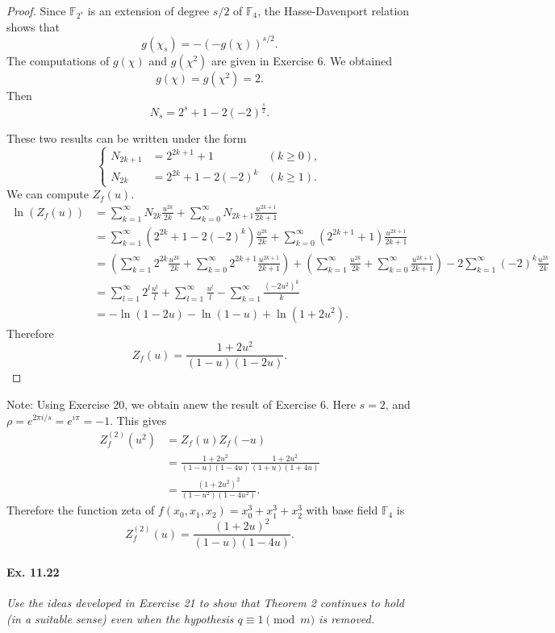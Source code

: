 \documentclass[11pt,a4paper]{article}
\newcommand{\F}{\mathbb{F}}
\begin{document}
\begin{proof}
Since $\F_{2^s}$ is an extension of degree $s/2$ of $\F_4$, the Hasse-Davenport relation shows that 
$$g(\chi_s) = -(-g(\chi))^{s/2}.$$
The computations of $g(\chi)$ and $g(\chi^2)$ are given in Exercise 6. We obtained 
$$g(\chi) = g(\chi^2) = 2.$$
Then
$$N_s = 2^s +1  - 2(-2)^{\frac{s}{2}}.$$

These two results can be written under the form
$$
\left\{
\begin{array}{lll}
N_{2k+1} &= 2^{2k+1} +1& (k \geq 0),\\
N_{2k} &= 2^{2k}+1 - 2 (-2)^k& (k \geq 1).
\end{array}
\right.
$$
We can compute $Z_f(u)$.
\begin{align*}
\ln(Z_f(u)) &= \sum_{k=1}^\infty N_{2k} \frac{u^{2k}}{2k} + \sum_{k=0}^\infty N_{2k+1} \frac{u^{2k+1}}{2k+1}\\
&= \sum_{k=1}^\infty \left(2^{2k} + 1 - 2(-2)^k \right) \frac{u^{2k}}{2k} + \sum_{k=0}^\infty \left( 2^{2k+1} + 1\right) \frac{u^{2k+1}}{2k+1}\\
&= \left(  \sum_{k=1}^\infty 2^{2k}  \frac{u^{2k}}{2k}  +  \sum_{k=0}^\infty 2^{2k+1} \frac{u^{2k+1}}{2k+1} \right) +  \left(  \sum_{k=1}^\infty \frac{u^{2k}}{2k}  +  \sum_{k=0}^\infty\frac{u^{2k+1}}{2k+1} \right)  -2  \sum_{k=1}^\infty(-2)^k \frac{u^{2k}}{2k} \\
&=  \sum_{l=1}^\infty 2^l \frac{u^l}{l} +  \sum_{l=1}^\infty  \frac{u^l}{l} - \sum_{k=1}^\infty \frac{(-2u^2)^k}{k}\\
&= - \ln(1-2u) - \ln(1-u) + \ln( 1 + 2u^2).
\end{align*}
Therefore
$$Z_f(u) = \frac{1 + 2u^2}{(1-u)(1-2u)}.$$
\end{proof}
Note: Using Exercise 20, we obtain anew the result of Exercise 6. Here $s = 2$, and $\rho = e^{2\pi i/s} = e^{i \pi} = -1$. This gives
\begin{align*}
Z_f^{(2)}(u^2) &= Z_f(u) Z_f(-u)\\
&= \frac{1+2u^2}{(1-u)(1-4u)} \frac{1+2u^2}{(1+u)(1+4u)}\\
&= \frac{(1 + 2u^2)^2}{(1 - u^2)(1 - 4u^2)}.
\end{align*}
Therefore the function zeta of $f (x_0,x_1,x_2) = x_0^3+x_1^3+x_2^3$ with base field $\F_4$ is $$Z_f^{(2)}(u) = \frac{(1 + 2u)^2}{(1-u)(1-4u)}.$$



\paragraph{Ex. 11.22}{\it Use the ideas developed in Exercise 21 to show that Theorem 2 continues to hold (in a suitable sense) even when the hypothesis $q \equiv 1 \pmod m$ is removed.
}
\end{document}
